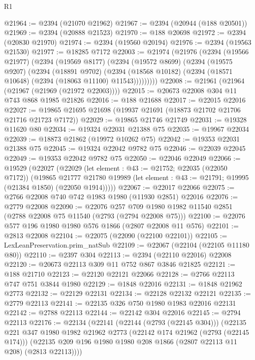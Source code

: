 \begin{lexlean}{R1}
\begin{coremodule}
@21964 := @2394 (@21070 @21962)
@21967 := @2394 (@20944 (@188 @20501))
@21969 := @2394 (@20888 @21523)
@21970 := @188 @20698
@21972 := @2394 (@20830 @21970)
@21974 := @2394 (@19560 @20194)
@21976 := @2394 (@19563 @21530)
@21977 := @18285 @7172
@22003 := @21974
    (@21976
      (@2394
        (@19566 @21977)
        (@2394
          (@19569 @8177)
          (@2394
            (@19572 @8699)
            (@2394
              (@19575 @9207)
              (@2394
                (@18891 @9702)
                (@2394 (@18568 @10182) (@2394 (@18571 @10648) (@2394 (@18063 @11100) @11543)))))))))
@22008 := @21961 (@21964 (@21967 (@21969 (@21972 @22003))))
@22015 := @20673 @22008 @304 @11 @743 @868 @1985 @21826
@22016 := @188 @21688
@22017 := @22015 @22016
@22027 := @19865 @21695 @21698 (@19937 @21691 (@18873 @21702 @21706 @21716 @21723 @7172))
@22029 := @19865 @21746 @21749
@22031 := @19328 @11620 @80
@22034 := @19324 @22031 @21388 @75
@22035 := @19967 @22034
@22039 := @18873 @21862 (@19972 @10262 @75)
@22042 := @19353 @22031 @21388 @75
@22045 := @19324 @22042 @9782 @75
@22046 := @22039 @22045
@22049 := @19353 @22042 @9782 @75
@22050 := @22046 @22049
@22066 := @19529
    (@22027
      (@22029
        (let element : @43 := @21752; @22035 (@22050 @7172))
        (@19865
          @21777
          @21780
          @19989
          (let element : @43 := @21791; @19995 (@21384 @1850) (@22050 @1914)))))
@22067 := @22017 @22066
@22075 := @2766 @22008 @740 @742 @1983 @1980 (@11930 @2851) @22016
@22076 := @2779 @22008
@22090 := @22076
    @257
    @709
    @1980
    @1982
    @11540
    @2851
    (@2788 @22008 @75 @11540 (@2793 (@2794 @22008 @75)))
@22100 := @22076 @577 @196 @1980 @1980 @576 @1866 (@2807 @22008 @11 @576)
@22101 := @2813 @22008
@22104 := @22075 (@22090 (@22100 @22101))
@22105 := LexLeanPreservation.prim_natSub
@22109 := @22067 (@22104 (@22105 @11180 @80))
@22110 := @2397 @304
@22113 := @2394 (@22110 @22016) @22008
@22120 := @20673 @22113 @309 @11 @752 @867 @3846 @21825
@22121 := @188 @21710
@22123 := @22120 @22121 @22066
@22128 := @2766 @22113 @747 @751 @3844 @1980
@22129 := @1848 @22016
@22131 := @1848 @21962 @2773
@22132 := @22129 @22131
@22134 := @22128 @22132 @22121
@22135 := @2779 @22113
@22141 := @22135 @326 @750 @1980 @1983 @22016 @22131
@22142 := @2788 @22113
@22144 := @22142 @304 @22016
@22145 := @2794 @22113
@22176 := @22134
    (@22141
      (@22144 (@2793 (@22145 @304)))
      (@22135
        @221
        @347
        @1980
        @1982
        @21962
        @2773
        (@22142 @174 @21962 (@2793 (@22145 @174)))
        (@22135 @209 @196 @1980 @1980 @208 @1866 (@2807 @22113 @11 @208) (@2813 @22113))))

\end{coremodule}
\end{lexlean}
